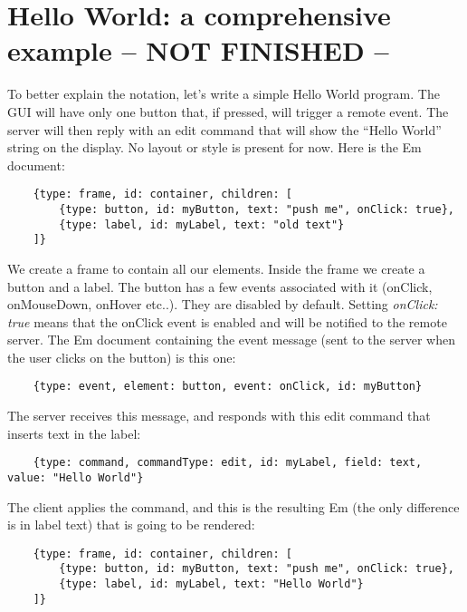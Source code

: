 

\section{Hello World: a comprehensive example -- NOT FINISHED --}

To better explain the notation, let's write a simple Hello World program. The GUI will have only one button that, if pressed, will trigger a remote event. The server will then reply with an edit command that will show the ``Hello World'' string on the display. No layout or style is present for now. Here is the Em document:

\begin{verbatim}
    {type: frame, id: container, children: [
        {type: button, id: myButton, text: "push me", onClick: true},
        {type: label, id: myLabel, text: "old text"}
    ]}
\end{verbatim}

We create a frame to contain all our elements. Inside the frame we create a button and a label. The button has a few events associated with it (onClick, onMouseDown, onHover etc..). They are disabled by default. Setting \textit{onClick: true} means that the onClick event is enabled and will be notified to the remote server. The Em document containing the event message (sent to the server when the user clicks on the button) is this one:

\begin{verbatim}
    {type: event, element: button, event: onClick, id: myButton}
\end{verbatim}

The server receives this message, and responds with this edit command that inserts text in the label:

\begin{verbatim}
    {type: command, commandType: edit, id: myLabel, field: text, value: "Hello World"}
\end{verbatim}

The client applies the command, and this is the resulting Em (the only difference is in label text) that is going to be rendered:

\begin{verbatim}
    {type: frame, id: container, children: [
        {type: button, id: myButton, text: "push me", onClick: true},
        {type: label, id: myLabel, text: "Hello World"}
    ]}
\end{verbatim}